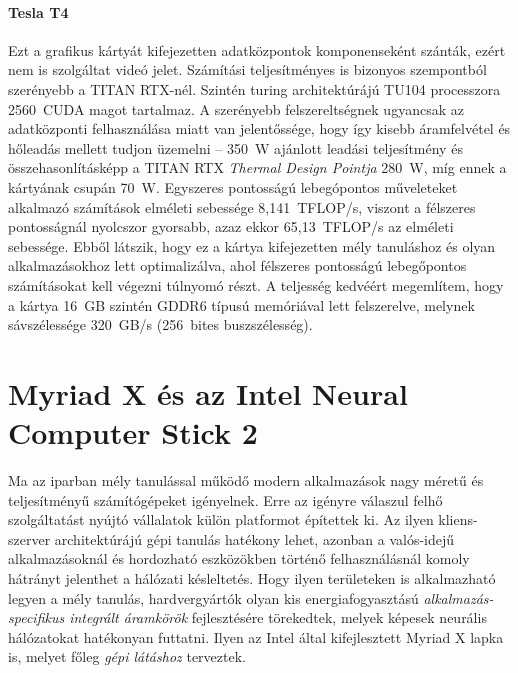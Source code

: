 \paragraph{Tesla T4}
Ezt a grafikus kártyát kifejezetten adatközpontok komponenseként szánták, ezért nem is szolgáltat videó jelet. Számítási teljesítményes is bizonyos szempontból szerényebb a TITAN RTX-nél. Szintén turing architektúrájú TU104 processzora 2560~CUDA magot tartalmaz. A szerényebb felszereltségnek ugyancsak az adatközponti felhasználása miatt van jelentőssége, hogy így kisebb áramfelvétel és hőleadás mellett tudjon üzemelni -- 350~W ajánlott leadási teljesítmény és összehasonlításképp a TITAN RTX \emph{Thermal Design Pointja} 280~W, míg ennek a kártyának csupán 70~W. Egyszeres pontosságú lebegópontos műveleteket alkalmazó számítások elméleti sebessége 8,141~TFLOP/s, viszont a félszeres pontosságnál nyolcszor gyorsabb, azaz ekkor 65,13~TFLOP/s az elméleti sebessége. Ebből látszik, hogy ez a kártya kifejezetten mély tanuláshoz és olyan alkalmazásokhoz lett optimalizálva, ahol félszeres pontosságú lebegőpontos számításokat kell végezni túlnyomó részt. A teljesség kedvéért megemlítem, hogy a kártya 16~GB szintén GDDR6 típusú memóriával lett felszerelve, melynek sávszélessége 320~GB/s (256~bites buszszélesség).

\section{Myriad X és az Intel Neural Computer Stick 2}
Ma az iparban mély tanulással működő modern alkalmazások nagy méretű és teljesítményű számítógépeket igényelnek. Erre az igényre válaszul felhő szolgáltatást nyújtó vállalatok külön platformot építettek ki. Az ilyen kliens-szerver architektúrájú gépi tanulás hatékony lehet, azonban a valós-idejű alkalmazásoknál és hordozható eszközökben történő felhasználásnál komoly hátrányt jelenthet a hálózati késleltetés. Hogy ilyen területeken is alkalmazható legyen a mély tanulás, hardvergyártók olyan kis energiafogyasztású \emph{alkalmazás-specifikus integrált áramkörök} fejlesztésére törekedtek, melyek képesek neurális hálózatokat hatékonyan futtatni. Ilyen az Intel által kifejlesztett Myriad X lapka is, melyet főleg \emph{gépi látáshoz} terveztek.

